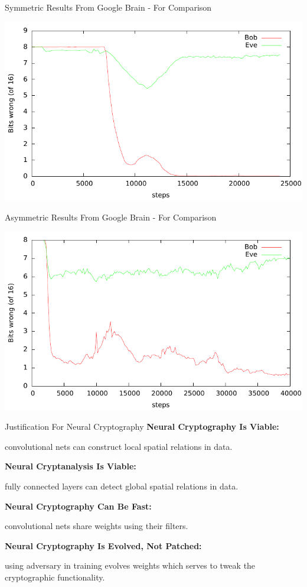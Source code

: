 \documentclass{beamer}
\begin{document}
		\begin{frame}{Symmetric Results From Google Brain - For Comparison}
			\begin{center}
				\includegraphics[height=0.8\textheight]{cryptolearn_batch_tighter}
			\end{center}
		\end{frame}
		\begin{frame}{Asymmetric Results From Google Brain - For Comparison}
			\begin{center}
				\includegraphics[height=0.8\textheight]{pubkey_bob_v_eve}
			\end{center}
		\end{frame}
		\begin{frame}{Justification For Neural Cryptography}
			 \vfill
			 \textbf{Neural Cryptography Is Viable:}\\
			 {\centering
			 	convolutional nets can construct local spatial relations in data.
			 	\par}
			 \vfill
			 \textbf{Neural Cryptanalysis Is Viable:}\\
			 {\centering
			 	fully connected layers can detect global spatial relations in data.
			 	\par}
			 \vfill
			 \textbf{Neural Cryptography Can Be Fast:}\\
			 {\centering
			 	convolutional nets share weights using their filters.
			 	\par}
			 \vfill
			 \textbf{Neural Cryptography Is Evolved, Not Patched:}\\
			 {\centering
			 	using adversary in training evolves weights which serves to tweak the cryptographic functionality.
			 	\par}
		\end{frame}
\end{document}
